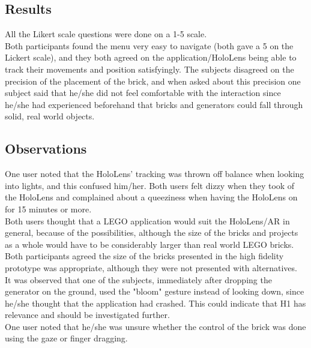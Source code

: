 \subsection{Results}
All the Likert scale questions were done on a 1-5 scale.\\
Both participants found the menu very easy to navigate (both gave a 5 on the Lickert scale), and they both agreed on the application/HoloLens being able to track their movements and position satisfyingly. The subjects disagreed on the precision of the placement of the brick, and when asked about this precision one subject said that he/she did not feel comfortable with the interaction since he/she had experienced beforehand that bricks and generators could fall through solid, real world objects.\\

\subsection{Observations}
One user noted that the HoloLens' tracking was thrown off balance when looking into lights, and this confused him/her. Both users felt dizzy when they took of the HoloLens and complained about a queeziness when having the HoloLens on for 15 minutes or more.\\
Both users thought that a LEGO application would suit the HoloLens/AR in general, because of the possibilities, although the size of the bricks and projects as a whole would have to be considerably larger than real world LEGO bricks. Both participants agreed the size of the bricks presented in the high fidelity prototype was appropriate, although they were not presented with alternatives.\\
It was observed that one of the subjects, immediately after dropping the generator on the ground, used the "bloom" gesture instead of looking down, since he/she thought that the application had crashed. This could indicate that H1 has relevance and should be investigated further.\\
One user noted that he/she was unsure whether the control of the brick was done using the gaze or finger dragging.